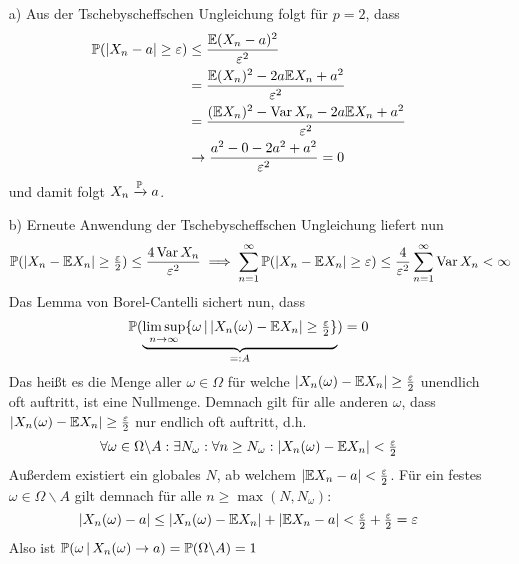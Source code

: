 \begin{loesung}
\begin{enumerate}
    \item[a)] Aus der Tschebyscheffschen Ungleichung folgt für $p=2$, dass 
    \begin{align*}  
        \P(|X_n - a| \geq \varepsilon) 
        &\leq \dfrac{\E(X_n-a)^2}{\varepsilon^2}  \\
        &= \dfrac{\E(X_n)^2-2a\E X_n+a^2}{\varepsilon^2} \\
        &= \dfrac{(\E X_n)^2-\Var X_n - 2a\E X_n+a^2}{\varepsilon^2} \\
        &\to \dfrac{a^2-0-2a^2+a^2}{\varepsilon^2} = 0
    \end{align*}
    und damit folgt $X_n\conP a$.
    \item[b)] Erneute Anwendung der Tschebyscheffschen Ungleichung liefert nun 
    \[
        \P(|X_n-\E X_n|\geq \tfrac{\varepsilon}{2}) 
        \leq \dfrac{4\Var X_n}{\varepsilon^2} 
        \implies 
        \sum_{n=1}^{\infty} \P(|X_n-\E X_n|\geq \varepsilon) 
        \leq \dfrac{4}{\varepsilon^2} \sum_{n=1}^{\infty} \Var X_n < \infty
    \]
    Das Lemma von Borel-Cantelli sichert nun, dass 
    \[
        \P(\underbrace{\limsup_{n\to\infty} \{\omega \,|\,|X_n(\omega)-\E X_n|\geq \tfrac{\varepsilon}{2}\}}_{=:A}) = 0
    \]
    Das heißt es die Menge aller $\omega\in\Omega$ für welche $|X_n(\omega)-\E X_n|\geq \tfrac{\varepsilon}{2}$ unendlich oft 
    auftritt, ist eine Nullmenge. Demnach gilt für alle anderen $\omega$, dass 
    $|X_n(\omega)-\E X_n|\geq \tfrac{\varepsilon}{2}$ nur endlich oft auftritt, d.h.
    \[
        \forall\omega\in\Omega\backslash A: \exists N_\omega: \forall n\geq N_\omega: 
        |X_n(\omega)-\E X_n| < \tfrac{\varepsilon}{2}
    \]
    Außerdem existiert ein globales $N$, ab welchem $|\E X_n - a | < \tfrac{\varepsilon}{2}$. 
    Für ein festes $\omega\in\Omega\backslash A$ gilt demnach für alle $n\geq \max(N,N_\omega)$:
    \[
        |X_n(\omega) - a| \leq |X_n(\omega) - \E X_n| + |\E X_n - a | 
        < \tfrac{\varepsilon}{2} + \tfrac{\varepsilon}{2} 
        = \varepsilon
    \]
    Also ist $\P(\omega\,|\,X_n(\omega)\to a) = \P(\Omega\backslash A) = 1$
\end{enumerate}
\end{loesung}

